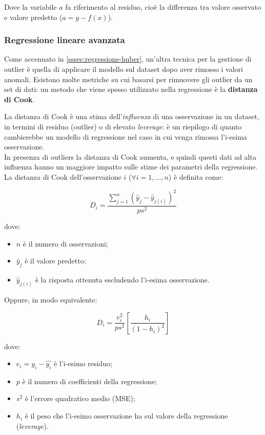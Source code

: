 Dove la variabile $a$ fa riferimento al residuo, cioè la differenza tra valore osservato e valore predetto ($a = y - f(x)$).


\subsubsection{Regressione lineare avanzata}\label{sssec:regressione-cook}
Come accennato in \ref{sssec:regressione-huber}, un'altra tecnica per la gestione di outlier è quella di applicare il modello sul dataset dopo aver rimosso i valori anomali. Esistono molte metriche su cui basarsi per rimuovere gli outlier da un set di dati: un metodo che viene spesso utilizzato nella regressione è la \textbf{distanza di Cook}.

La distanza di Cook è una stima dell'\textit{influenza} di una osservazione in un dataset, in termini di residuo (outlier) o di elevato \textit{leverage}: è un riepilogo di quanto cambierebbe un modello di regressione nel caso in cui venga rimossa l'i-esima osservazione.\\

In presenza di outliers la distanza di Cook aumenta, e quindi questi dati ad alta influenza hanno un maggiore impatto sulle stime dei parametri della regressione.\\

La distanza di Cook \cite{cook_def} dell'osservazione $i$ ($\forall i=1, \ldots, n$) è definita come:

$$D_{i}=\frac{\sum_{j=1}^{n}\left(\hat{y}_{j}-\hat{y}_{j(i)}\right)^{2}}{p s^{2}}$$\smallskip

dove:

\begin{itemize}
  \item $n$ è il numero di osservazioni;
  \item $\hat{y}_{j}$ è il valore predetto;
  \item $\hat{y}_{j(i)}$ è la risposta ottenuta escludendo l'i-esima osservazione.
\end{itemize}

Oppure, in modo equivalente:

$$D_{i}=\frac{e_{i}^2}{p s^{2}}\left[\frac{h_{i}}{\left(1-h_{i}\right)^{2}}\right]$$\smallskip

dove:

\begin{itemize}
  \item $e_{i} = y_i - \hat{y_i}$  è l'i-esimo residuo;
  \item $p$ è il numero di coefficienti della regressione;
  \item $s^2$ è l'errore quadratico medio (MSE);
  \item $h_i$ è il peso che l'i-esimo osservazione ha sul valore della regressione (\textit{leverage}).
\end{itemize}

